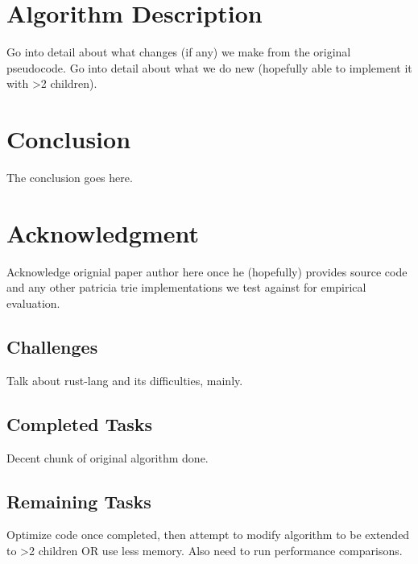 \documentclass[conference]{IEEEtran}
\begin{document}
\section{Algorithm Description}
Go into detail about what changes (if any) we make from the original pseudocode. Go into detail about what we do new (hopefully able to implement it with >2 children).


\section{Conclusion}
The conclusion goes here.


\section{Acknowledgment}
Acknowledge orignial paper author here once he (hopefully) provides source code and any other patricia trie implementations we test against for empirical evaluation.


\appendix
\subsection{Challenges}
Talk about rust-lang and its difficulties, mainly.


\subsection{Completed Tasks}
Decent chunk of original algorithm done.


\subsection{Remaining Tasks}
Optimize code once completed, then attempt to modify algorithm to be extended to >2 children OR use less memory.
Also need to run performance comparisons.




\end{document}
